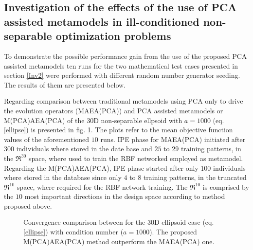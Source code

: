 \subsection{Investigation of the effects of the use of PCA assisted metamodels in ill-conditioned non-separable optimization problems}

To demonstrate the possible performance gain from the use of the proposed PCA assisted metamodels ten runs for the two mathematical test cases presented in section \ref{Inv2} were performed with different random number generator seeding. The results of them are presented below. 

Regarding comparison between traditional metamodels using PCA only to drive the evolution operators (MAEA(PCA)) and PCA assisted metamodels  or M(PCA)AEA(PCA) of the 30D non-separable ellpsoid with $a=1000$ (eq. \ref{ellipse}) is presented in fig. \ref{Ellt3-m}. The plots refer to the mean objective function values of the aforementioned $10$ runs. IPE phase for MAEA(PCA) initiated after $300$ individuals where stored in the date base and $25$ to $29$ training patterns, in the $\Re^{30}$ space, where used to train the RBF networked employed as metamodel. Regarding the M(PCA)AEA(PCA), IPE phase started after only $100$ individuals where stored in the database since only $4$ to $8$ training patterns, in the truncated  $\Re^{10}$  space, where required for the RBF network training. The $\Re^{10}$ is comprised by the $10$ most important directions in the design space according to method proposed above. 

\begin{figure}[h!]
\begin{minipage}[b]{1\linewidth}
 \centering
\end{minipage}
\caption{Convergence comparison between for the 30D ellipsoid case (eq. \ref{ellipse}) with condition number ($a = 1000$). The proposed M(PCA)AEA(PCA) method outperform the MAEA(PCA) one.} 
\label{Ellt3-m}
\end{figure}


